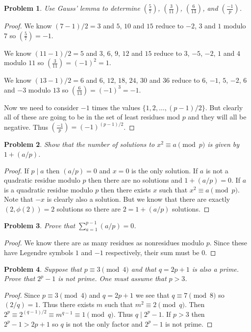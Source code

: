 \documentclass{article}
\newtheorem{problem}{Problem}
\begin{document}
\begin{problem}
Use Gauss' lemma to determine $\left ( \frac{5}{7} \right )$, $\left ( \frac{3}{11} \right )$, $\left ( \frac{6}{13} \right )$, and $\left ( \frac{-1}{p} \right )$.
\end{problem}
\begin{proof}
We know $(7-1)/2 = 3$ and $5$, $10$ and $15$ reduce to $-2$, $3$ and $1$ modulo $7$ so $\left ( \frac{5}{7} \right ) = -1$.

We know $(11-1)/2 = 5$ and $3$, $6$, $9$, $12$ and $15$ reduce to $3$, $-5$, $-2$, $1$ and $4$ modulo $11$ so $\left ( \frac{3}{11} \right ) = (-1)^2 = 1$.

We know $(13-1)/2 = 6$ and $6$, $12$, $18$, $24$, $30$ and $36$ reduce to $6$, $-1$, $5$, $-2$, $6$ and $-3$ modulo $13$ so $\left ( \frac{6}{13} \right ) = (-1)^3 = -1$.

Now we need to consider $-1$ times the values $\{1, 2, \dots , (p-1)/2\}$. But clearly all of these are going to be in the set of least residues mod $p$ and they will all be negative. Thus $\left ( \frac{-1}{p} \right ) = (-1)^{(p-1)/2}$.
\end{proof}

\begin{problem}
Show that the number of solutions to $x^2 \equiv a \pmod{p}$ is given by $1 + (a/p)$.
\end{problem}
\begin{proof}
If $p \mid a$ then $(a/p) = 0$ and $x = 0$ is the only solution. If $a$ is not a quadratic residue modulo $p$ then there are no solutions and $1 + (a/p) = 0$. If $a$ is a quadratic residue modulo $p$ then there exists $x$ such that $x^2 \equiv a \pmod{p}$. Note that $-x$ is clearly also a solution. But we know that there are exactly $(2,\phi(2)) = 2$ solutions so there are $2 = 1 + (a/p)$ solutions.
\end{proof}

\begin{problem}
Prove that $\sum_{a=1}^{p-1} (a/p) = 0$.
\end{problem}
\begin{proof}
We know there are as many residues as nonresidues modulo $p$. Since these have Legendre symbols $1$ and $-1$ respectively, their sum must be $0$.
\end{proof}

\begin{problem}
Suppose that $p \equiv 3 \pmod{4}$ and that $q = 2p + 1$ is also a prime. Prove that $2^p - 1$ is not prime. One must assume that $p > 3$.
\end{problem}
\begin{proof}
Since $p \equiv 3 \pmod{4}$ and $q = 2p + 1$ we see that $q \equiv 7 \pmod{8}$ so $(2/q) = 1$. Thus there exists $m$ such that $m^2 \equiv 2 \pmod{q}$. Then $2^p \equiv 2^{(q-1)/2} \equiv m^{q-1} \equiv 1 \pmod{q}$. Thus $q \mid 2^p - 1$. If $p > 3$ then $2^p - 1 > 2p + 1$ so $q$ is not the only factor and $2^p - 1$ is not prime.
\end{proof}
\end{document}
